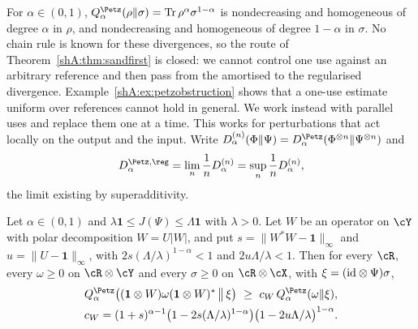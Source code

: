 For $\alpha\in(0,1)$, $Q^\Petz_\alpha(\rho\|\sigma)=\Tr\rho^\alpha\sigma^{1-\alpha}$ is nondecreasing and homogeneous of degree $\alpha$ in $\rho$, and nondecreasing and homogeneous of degree $1-\alpha$ in $\sigma$. No chain rule is known for these divergences, so the route of Theorem~\ref{shA:thm:sandfirst} is closed: we cannot control one use against an arbitrary reference and then pass from the amortised to the regularised divergence. Example~\ref{shA:ex:petzobstruction} shows that a one-use estimate uniform over references cannot hold in general. We work instead with parallel uses and replace them one at a time. This works for perturbations that act locally on the output and the input. Write $D^{(n)}_\alpha(\Phi\|\Psi)=D^\Petz_\alpha(\Phi^{\otimes n}\|\Psi^{\otimes n})$ and
\[
D^{\Petz,\reg}_\alpha=\lim_n\frac1nD^{(n)}_\alpha=\sup_n\frac1nD^{(n)}_\alpha,
\]
the limit existing by superadditivity.

\begin{lemma}\label{shA:lem:localstab}
Let $\alpha\in(0,1)$ and $\lambda\mathbf 1\le J(\Psi)\le\Lambda\mathbf 1$ with $\lambda>0$. Let $W$ be an operator on $\cY$ with polar decomposition $W=U|W|$, and put $s=\|W^*W-\mathbf 1\|_\infty$ and $u=\|U-\mathbf 1\|_\infty$, with $2s(\Lambda/\lambda)^{1-\alpha}<1$ and $2u\Lambda/\lambda<1$. Then for every $\cR$, every $\omega\ge0$ on $\cR\otimes\cY$ and every $\sigma\ge0$ on $\cR\otimes\cX$, with $\xi=(\mathrm{id}\otimes\Psi)\sigma$,
\begin{gather*}
Q^\Petz_\alpha\big((\mathbf 1\otimes W)\omega(\mathbf 1\otimes W)^*\,\big\|\,\xi\big)\ \ge\ c_W\,Q^\Petz_\alpha(\omega\|\xi),\\
 c_W=(1+s)^{\alpha-1}\big(1-2s(\Lambda/\lambda)^{1-\alpha}\big)\big(1-2u\Lambda/\lambda\big)^{1-\alpha}.
\end{gather*}
\end{lemma}

